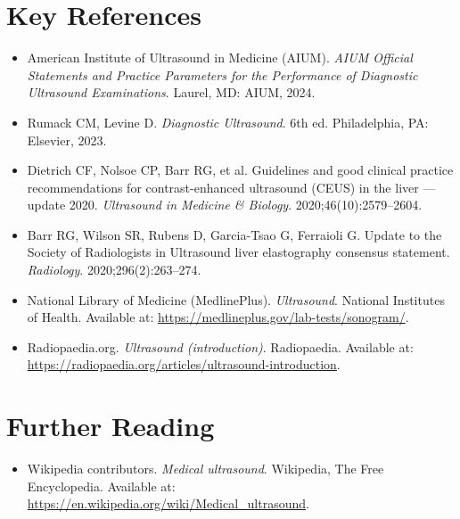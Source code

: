 \section{Key References}
\begin{itemize}
  \item American Institute of Ultrasound in Medicine (AIUM). \textit{AIUM Official Statements and Practice Parameters for the Performance of Diagnostic Ultrasound Examinations}. Laurel, MD: AIUM, 2024.
  \item Rumack CM, Levine D. \textit{Diagnostic Ultrasound}. 6th ed. Philadelphia, PA: Elsevier, 2023.
  \item Dietrich CF, Nolsoe CP, Barr RG, et al. Guidelines and good clinical practice recommendations for contrast-enhanced ultrasound (CEUS) in the liver --- update 2020. \textit{Ultrasound in Medicine \& Biology}. 2020;46(10):2579--2604.
  \item Barr RG, Wilson SR, Rubens D, Garcia-Tsao G, Ferraioli G. Update to the Society of Radiologists in Ultrasound liver elastography consensus statement. \textit{Radiology}. 2020;296(2):263--274.
  \item National Library of Medicine (MedlinePlus). \textit{Ultrasound}. National Institutes of Health. Available at: \url{https://medlineplus.gov/lab-tests/sonogram/}.
  \item Radiopaedia.org. \textit{Ultrasound (introduction)}. Radiopaedia. Available at: \url{https://radiopaedia.org/articles/ultrasound-introduction}.
\end{itemize}

\section{Further Reading}
\begin{itemize}
  \item Wikipedia contributors. \textit{Medical ultrasound}. Wikipedia, The Free Encyclopedia. Available at: \url{https://en.wikipedia.org/wiki/Medical_ultrasound}.
\end{itemize}

